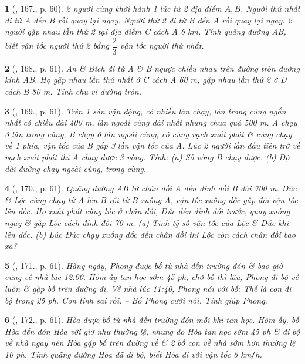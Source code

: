\documentclass{article}
\newtheorem{baitoan}{}
\begin{document}
\begin{baitoan}[\cite{Binh_Toan_6_tap_2}, 167., p. 60]
	2 người cùng khởi hành 1 lúc từ 2 địa điểm $A,B$. Người thứ nhất đi từ A đến B rồi quay lại ngay. Người thứ 2 đi từ B đến A rồi quay lại ngay. 2 người gặp nhau lần thứ 2 tại địa điểm C cách A {\rm6 km}. Tính quãng đường AB, biết vận tốc người thứ 2 bằng $\dfrac{2}{3}$ vận tốc người thứ nhất.
\end{baitoan}

\begin{baitoan}[\cite{Binh_Toan_6_tap_2}, 168., p. 61]
	An \& Bích đi từ A \& B ngược chiều nhau trên đường tròn đường kính AB. Họ gặp nhau lần thứ nhất ở C cách A {\rm60 m}, gặp nhau lần thứ 2 ở D cách B {\rm80 m}. Tính chu vi đường tròn.
\end{baitoan}

\begin{baitoan}[\cite{Binh_Toan_6_tap_2}, 169., p. 61]
	Trên 1 sân vận động, có nhiều làn chạy, làn trong cùng ngắn nhất có chiều dài {\rm400 m}, làn ngoài cùng dài nhất nhưng chưa quá {\rm500 m}. A chạy ở làn trong cùng, B chạy ở làn ngoài cùng, có cùng vạch xuất phát \& cùng chạy về 1 phía, vận tốc của B gấp 3 lần vận tốc của A. Lúc 2 người lần đầu tiên trở về vạch xuất phát thì A chạy được 3 vòng. Tính: (a) Số vòng B chạy được. (b) Độ dài đường chạy ngoài cùng, trong cùng.
\end{baitoan}

\begin{baitoan}[\cite{Binh_Toan_6_tap_2}, 170., p. 61]
	Quãng đường AB từ chân đồi A đến đỉnh đồi B dài {\rm700 m}. Đức \& Lộc cùng chạy từ A lên B rồi từ B xuống A, vận tốc xuống dốc gấp đôi vận tốc lên dốc. Họ xuất phát cùng lúc ở chân đồi, Đức đến đỉnh đồi trước, quay xuống ngay \& gặp Lộc cách đỉnh đồi {\rm70 m}. (a) Tính tỷ số vận tốc của Lộc \& Đức khi lên dốc. (b) Lúc Đức chạy xuống dốc đến chân đồi thì Lộc còn cách chân đồi bao xa?
\end{baitoan}

\begin{baitoan}[\cite{Binh_Toan_6_tap_2}, 171., p. 61]
	Hàng ngày, Phong được bố từ nhà đến trường đón \& bao giờ cũng về nhà lúc {\rm12:00}. Hôm ấy tan học sớm {\rm45 ph}, chờ bố thì lâu, Phong đi bộ về luôn \& gặp bố trên đường đi. Về nhà lúc {\rm11:40}, Phong nói với bố: Thế là con đi bộ trong {\rm25 ph}. Con tính sai rồi. -- Bố Phong cười nói. Tính giúp Phong.
\end{baitoan}

\begin{baitoan}[\cite{Binh_Toan_6_tap_2}, 172., p. 61]
	Hòa được bố từ nhà đến trường đón mỗi khi tan học. Hôm ấy, bố Hòa đến đón Hòa với giờ như thường lệ, nhưng do Hòa tan học sớm {\rm45 ph} \& đi bộ về nhà ngay nên Hòa gặp bố trên đường về \& 2 bố con về nhà sớm hơn thường lệ {\rm10 ph}. Tính quãng đường Hòa đã đi bộ, biết Hòa đi với vận tốc {\rm6 km{\tt/}h}.
\end{baitoan}
\end{document}

